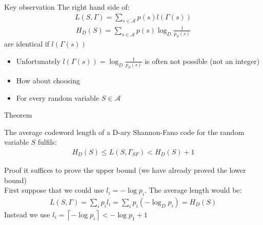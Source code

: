 

\begin{parag}{Key observation}
    The right hand side of:
    \begin{align*}
        L(S, \Gamma) = \sum_{s \in \mathcal{A}} p(s) l ( \Gamma (s))
    \end{align*}
    \begin{align*}
        H_D(S) = \sum_{s \in \mathcal{A}} p(s) \log_D \frac{1}{p_S(s)}
    \end{align*}
    are identical if $l( \Gamma (s))$
    \begin{itemize}
        \item Unfortunately $l( \Gamma (s)) = \log_D \frac{1}{p_S(s)}$ is often not possible (not an integer)
        \item How about choosing
    \end{itemize}
    
    \begin{theoreme}
        \begin{itemize}
            \item For every random variable $S \in \mathcal{A}$
        \end{itemize}
    \end{theoreme}
\end{parag}

\begin{parag}{Theorem}
    
    \begin{theoreme}
        The average codeword length of a D-ary Shannon-Fano code for the random variable $S$ fulfils: 
        \begin{align*}
            H_D(S) \leq L(S, \Gamma_{SF}) < H_D(S) + 1
        \end{align*}
        
    \end{theoreme}
   \begin{subparag}{Proof}
       it suffices to prove the upper bound (we have already proved the lower bound) 
       \\
       First suppose that we could use $l_i = -\log p_i$. The average length would be:
       \begin{align*}
           L(S, \Gamma) = \sum_i p_i l_i = \sum_i p_i (-\log_D p_i) = H_D(S)
       \end{align*}
       Instead we use $l_i = \left\lceil -\log p_i \right \rceil < - \log p_1 + 1 $
       
   \end{subparag} 

\end{parag}

